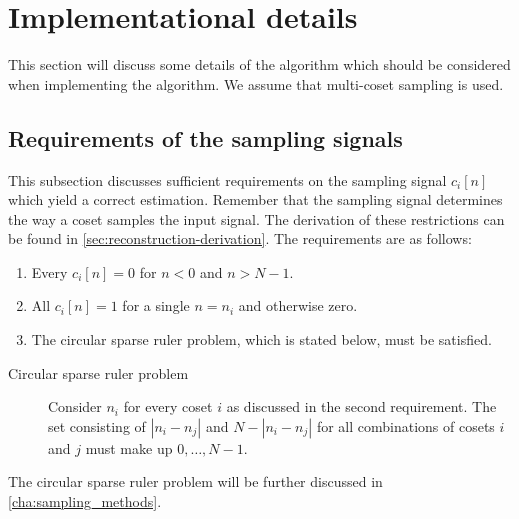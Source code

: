 \documentclass[a4paper, openany, oneside]{memoir}
\begin{document}
\section{Implementational details}
\label{sec:reconstruction-implementation}
This section will discuss some details of the algorithm which should be considered when implementing the algorithm. We assume that multi-coset sampling is used.

\subsection{Requirements of the sampling signals}
\label{sub:reconstruction-ci}
This subsection discusses sufficient requirements on the sampling signal $c_i[n]$ which yield a correct estimation. Remember that the sampling signal determines the way a coset samples the input signal. The derivation of these restrictions can be found in \cref{sec:reconstruction-derivation}. The requirements are as follows:

\begin{enumerate}
    \item Every $c_i[n]=0$ for $n < 0$ and $n > N-1$.
    \item All $c_i[n]=1$ for a single $n=n_i$ and otherwise zero.
    \item The circular sparse ruler problem, which is stated below, must be satisfied.
\end{enumerate}

\begin{description}
    \item[Circular sparse ruler problem] Consider $n_i$ for every coset $i$ as discussed in the second requirement. The set consisting of $|n_i - n_j|$ and $N-|n_i-n_j|$ for all combinations of cosets $i$ and $j$ must make up $0,\ldots,N-1$.
\end{description}

The circular sparse ruler problem will be further discussed in \cref{cha:sampling_methods}.
\end{document}
